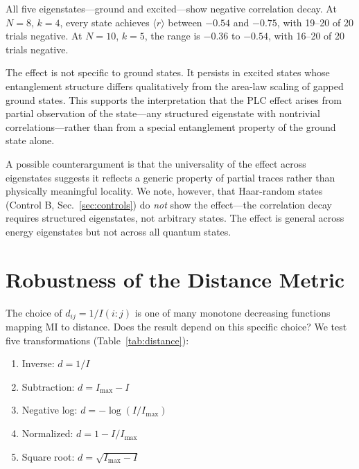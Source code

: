 \documentclass[aps,pra,twocolumn,superscriptaddress]{revtex4-2}
\begin{document}
All five eigenstates---ground and excited---show negative correlation decay. At $N = 8$, $k = 4$, every state achieves $\langle r \rangle$ between $-0.54$ and $-0.75$, with 19--20 of 20 trials negative. At $N = 10$, $k = 5$, the range is $-0.36$ to $-0.54$, with 16--20 of 20 trials negative.

The effect is not specific to ground states. It persists in excited states whose entanglement structure differs qualitatively from the area-law scaling of gapped ground states. This supports the interpretation that the PLC effect arises from partial observation of the state---any structured eigenstate with nontrivial correlations---rather than from a special entanglement property of the ground state alone.

A possible counterargument is that the universality of the effect across eigenstates suggests it reflects a generic property of partial traces rather than physically meaningful locality. We note, however, that Haar-random states (Control B, Sec.~\ref{sec:controls}) do \emph{not} show the effect---the correlation decay requires structured eigenstates, not arbitrary states. The effect is general across energy eigenstates but not across all quantum states.


\section{Robustness of the Distance Metric}
\label{sec:distance}

The choice of $d_{ij} = 1/I(i{:}j)$ is one of many monotone decreasing functions mapping MI to distance. Does the result depend on this specific choice? We test five transformations (Table~\ref{tab:distance}):

\begin{enumerate}
\item Inverse: $d = 1/I$
\item Subtraction: $d = I_\text{max} - I$
\item Negative log: $d = -\log(I / I_\text{max})$
\item Normalized: $d = 1 - I/I_\text{max}$
\item Square root: $d = \sqrt{I_\text{max} - I}$
\end{enumerate}
\end{document}
